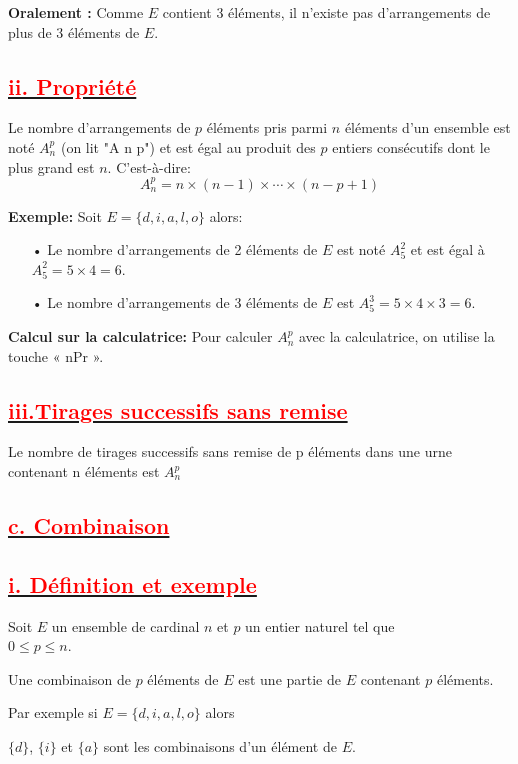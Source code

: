 \documentclass[12pt]{article}
\begin{document}
\textbf{Oralement :} Comme \( E \) contient 3 éléments, il n’existe pas d’arrangements de plus de 3 éléments de \( E \).
\subsection*{\underline{\textbf{\textcolor{red}{ii. Propriété}}}}
Le nombre d'arrangements de \( p \) éléments pris parmi \( n \) éléments d'un ensemble est noté \( A_n^p \) (on lit "A n p") et est égal au produit des \( p \) entiers consécutifs dont le plus grand est \( n \). C'est-à-dire:
\[
A_n^p = n \times (n-1) \times \cdots \times (n-p+1)
\]

\textbf{Exemple:}
Soit \( E = \{d, i, a, l, o\} \) alors:
\begin{itemize}
    \item[•] Le nombre d'arrangements de 2 éléments de \( E \) est noté \( A_5^2 \) et est égal à \( A_5^2 =5\times 4 = 6 \).
    \item[•] Le nombre d'arrangements de 3 éléments de \( E \) est \( A_5^3 = 5 \times 4 \times 3 = 6 \).
\end{itemize}

\textbf{Calcul sur la calculatrice:}
Pour calculer \( A_n^p \) avec la calculatrice, on utilise la touche « nPr ».
\subsection*{\underline{\textbf{\textcolor{red}{iii.Tirages successifs sans remise}}}}
Le nombre de tirages successifs sans remise de p éléments dans une urne contenant n 
éléments est $A_{n}^{p}$
\subsection*{\underline{\textbf{\textcolor{red}{c. Combinaison}}}}
\subsection*{\underline{\textbf{\textcolor{red}{i. Définition et exemple }}}}
Soit $E$ un ensemble de cardinal $n$ et $p$ un entier naturel tel que\\ $0 \leq p \leq n$.

Une combinaison de  $p$ éléments de $E$ est une partie de $E$ contenant $p$ éléments.

Par exemple si $E = \{d, i, a, l, o\}$ alors

$\{d\}$, $\{i\}$ et $\{a\}$ sont les combinaisons d'un élément de $E$.
\end{document}
